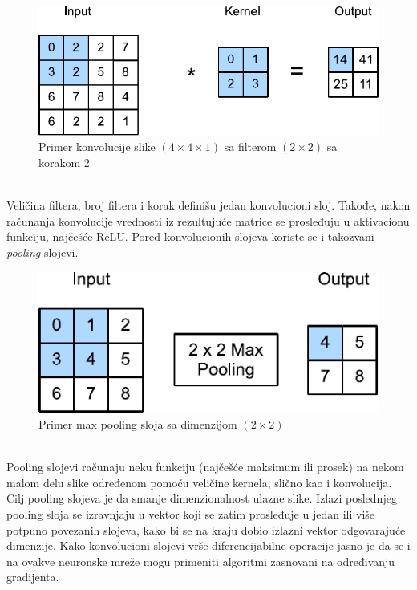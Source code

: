 \documentclass[a4paper,fleqn,12pt]{JMThesis}
\theoremstyle{plain}
\theoremstyle{definition}
\theoremstyle{definition}
\begin{document}
\begin{figure}[!ht]
	\centering
    \includegraphics[scale=1]{../graph-visuals/convolution-operation-stride-2.pdf}
	\caption{Primer konvolucije slike $(4 \times 4 \times 1)$ sa filterom $(2 \times 2)$ sa korakom 2}
\end{figure}\\
Veličina filtera, broj filtera i korak definišu jedan konvolucioni sloj. Takođe, nakon računanja konvolucije
vrednosti iz rezultujuće matrice se prosleđuju u aktivacionu funkciju, najčešće ReLU. Pored konvolucionih slojeva koriste se
i takozvani \textit{pooling} slojevi.
\begin{figure}[!ht]
	\centering
    \includegraphics[scale=1]{../graph-visuals/max-pooling.pdf}
	\caption{Primer max pooling sloja sa dimenzijom $(2 \times 2)$}
\end{figure}\\
Pooling slojevi računaju neku funkciju (najčešće maksimum ili prosek) na nekom malom delu slike određenom pomoću veličine kernela,
slično kao i konvolucija. Cilj pooling slojeva je da smanje dimenzionalnost ulazne slike. Izlazi poslednjeg pooling sloja se
izravnjaju u vektor koji se zatim prosleđuje u jedan ili više potpuno povezanih slojeva, kako bi se na kraju dobio izlazni vektor
odgovarajuće dimenzije. Kako konvolucioni slojevi vrše diferencijabilne operacije jasno je da se i na ovakve neuronske mreže mogu
primeniti algoritmi zasnovani na određivanju gradijenta.
\end{document}
